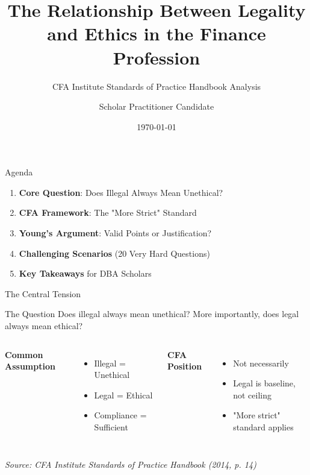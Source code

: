 \documentclass{beamer}
\title{The Relationship Between Legality and Ethics in the Finance Profession}
\subtitle{CFA Institute Standards of Practice Handbook Analysis}
\author{Scholar Practitioner Candidate}
\date{\today}
\renewcommand{\footnotesize}{\fontsize{6pt}{8pt}\selectfont}
\begin{document}
	
	\begin{frame}
		\titlepage
	\end{frame}
	
	\begin{frame}{Agenda}
		\begin{enumerate}
			\item \textbf{Core Question}: Does Illegal Always Mean Unethical?
			\item \textbf{CFA Framework}: The "More Strict" Standard
			\item \textbf{Young's Argument}: Valid Points or Justification?
			\item \textbf{Challenging Scenarios} (20 Very Hard Questions)
			\item \textbf{Key Takeaways} for DBA Scholars
		\end{enumerate}
	\end{frame}
	
	\begin{frame}{The Central Tension}
		\begin{block}{The Question}
			Does illegal always mean unethical? More importantly, does legal always mean ethical?
		\end{block}
		
		\begin{columns}
			\column{0.5\textwidth}
			\textbf{Common Assumption}
			\begin{itemize}
				\item Illegal = Unethical
				\item Legal = Ethical
				\item Compliance = Sufficient
			\end{itemize}
			
			\column{0.5\textwidth}
			\textbf{CFA Position}
			\begin{itemize}
				\item Not necessarily
				\item Legal is baseline, not ceiling
				\item \textcolor{cfablue}{"More strict" standard applies}
			\end{itemize}
		\end{columns}
		
		\vspace{0.3cm}
		\footnotesize \textit{Source: CFA Institute Standards of Practice Handbook (2014, p. 14)}
	\end{frame}
	
\end{document}
